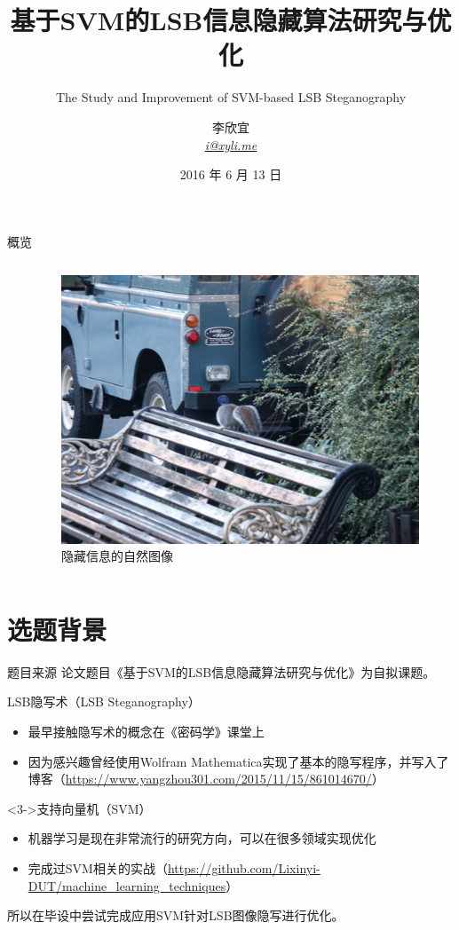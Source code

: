 \documentclass[14pt]{Bredelebeamer}
\title[本科毕设]{基于SVM的LSB信息隐藏算法研究与优化}
\subtitle{The Study and Improvement of SVM-based LSB Steganography}
\author[\href{mailto:i@xyli.me}{\faEnvelopeO{ } \textit{i@xyli.me}}]{李欣宜 \\ \href{mailto:i@xyli.me}{\faEnvelopeO{ } \textit{i@xyli.me}}}
\institute[]{大连理工大学本科毕业设计（论文）}
\date{\faCalendar{ } 2016 年 6 月 13 日}
\begin{document}
\begin{frame}
  \titlepage
\end{frame}

\begin{frame}{概览}
  \begin{columns}
    \begin{column}{.3\textwidth}
        \tableofcontents
    \end{column}
    \begin{column}{.68\textwidth}
      \begin{figure}
        \centering
        \caption{隐藏信息的自然图像}
        \includegraphics[width=.8\textwidth]{images/naturepic.png}
      \end{figure}
    \end{column}
  \end{columns}
\end{frame}

\section{选题背景}
\begin{frame}{题目来源}
  论文题目《基于SVM的LSB信息隐藏算法研究与优化》为自拟课题。
  \pause
  \begin{alertblock}{LSB隐写术（LSB Steganography）}
    \begin{itemize}
      \item 最早接触隐写术的概念在《密码学》课堂上
      \item 因为感兴趣曾经使用Wolfram Mathematica实现了基本的隐写程序，并写入了博客（\faChain \url{https://www.yangzhou301.com/2015/11/15/861014670/}）
    \end{itemize}
  \end{alertblock}
  \pause
  \begin{block}<3->{支持向量机（SVM）}
    \begin{itemize}
      \item 机器学习是现在非常流行的研究方向，可以在很多领域实现优化
      \item 完成过SVM相关的实战（\faChain \url{https://github.com/Lixinyi-DUT/machine_learning_techniques}）
    \end{itemize}
  \end{block}
  \pause
  所以在毕设中尝试完成应用SVM针对LSB图像隐写进行优化。
\end{frame}
\end{document}
